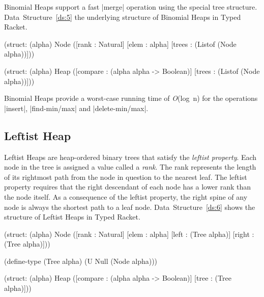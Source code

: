 Binomial Heaps support a fast \scheme|merge| operation using the special
tree structure. Data~Structure~\ref{ds:5} the underlying structure of
Binomial Heaps in Typed Racket.

\begin{datastructure}
  \begin{schemedisplay}

    (struct: (alpha) Node
      ([rank : Natural]
       [elem : alpha]
       [trees : (Listof (Node alpha))]))

    (struct: (alpha) Heap
      ([compare : (alpha alpha -> Boolean)]
       [trees       : (Listof (Node alpha))]))
  \end{schemedisplay}
  \label{ds:5}
\end{datastructure}

\noindent
Binomial Heaps provide a worst-case running time of \emph{O}(log~n) for
the operations \scheme|insert|, \scheme|find-min/max| and
\scheme|delete-min/max|.

\subsection*{Leftist Heap}
Leftist Heaps \citep{crane} are heap-ordered binary trees that satisfy
the \emph{leftist property}.  Each node in the tree is assigned a value
called a \emph{rank}.  The rank represents the length of its rightmost
path from the node in question to the nearest leaf. The leftist property
requires that the right descendant of each node has a lower rank than
the node itself. As a consequence of the leftist property, the right
spine of any node is always the shortest path to a leaf
node. Data~Structure~\ref{ds:6} shows the structure of Leftist Heaps in
Typed Racket.%

\begin{datastructure}
  \begin{schemedisplay}

    (struct: (alpha) Node
      ([rank : Natural]
       [elem : alpha]
       [left   : (Tree alpha)]
       [right : (Tree alpha)]))

    (define-type (Tree alpha) (U Null (Node alpha)))

    (struct: (alpha) Heap
      ([compare : (alpha alpha -> Boolean)]
       [tree        : (Tree alpha)]))

  \end{schemedisplay}
  \label{ds:6}
\end{datastructure}

